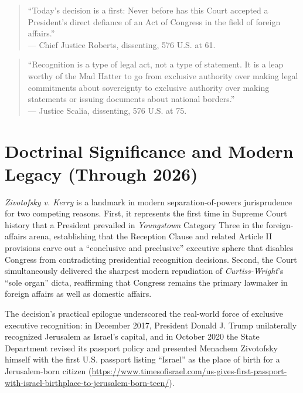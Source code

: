 \documentclass[12pt]{article}
\begin{document}
\begin{quote}
``Today's decision is a first: Never before has this Court accepted a President's direct defiance of an Act of Congress in the field of foreign affairs.'' \\
--- Chief Justice Roberts, dissenting, 576 U.S. at 61.
\end{quote}

\begin{quote}
``Recognition is a type of legal act, not a type of statement. It is a leap worthy of the Mad Hatter to go from exclusive authority over making legal commitments about sovereignty to exclusive authority over making statements or issuing documents about national borders.'' \\
--- Justice Scalia, dissenting, 576 U.S. at 75.
\end{quote}

\section{Doctrinal Significance and Modern Legacy (Through 2026)}
\textit{Zivotofsky v. Kerry} is a landmark in modern separation-of-powers jurisprudence for two competing reasons. First, it represents the first time in Supreme Court history that a President prevailed in \textit{Youngstown} Category Three in the foreign-affairs arena, establishing that the Reception Clause and related Article II provisions carve out a ``conclusive and preclusive'' executive sphere that disables Congress from contradicting presidential recognition decisions. Second, the Court simultaneously delivered the sharpest modern repudiation of \textit{Curtiss-Wright}'s ``sole organ'' dicta, reaffirming that Congress remains the primary lawmaker in foreign affairs as well as domestic affairs.

The decision's practical epilogue underscored the real-world force of exclusive executive recognition: in December 2017, President Donald J. Trump unilaterally recognized Jerusalem as Israel's capital, and in October 2020 the State Department revised its passport policy and presented Menachem Zivotofsky himself with the first U.S. passport listing ``Israel'' as the place of birth for a Jerusalem-born citizen (\url{https://www.timesofisrael.com/us-gives-first-passport-with-israel-birthplace-to-jerusalem-born-teen/}).
\end{document}
